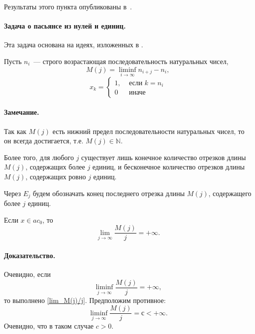 Результаты этого пункта опубликованы в~\cite{our-mz2019ac0}.

\paragraph{Задача о пасьянсе из нулей и единиц.}

Эта задача основана на идеях, изложенных в \cite[\S 5]{Semenov2014geomprops}.

Пусть $n_i$~--- строго возрастающая последовательность натуральных чисел,
\begin{equation}
	\label{eq:definition_M_j}
	M(j) = \liminf_{i\to\infty} n_{i+j} - n_i,
\end{equation}
\begin{equation}
	x_k = \left\{\begin{array}{ll}
		1, & \mbox{~если~} k = n_i
		\\
		0  & \mbox{~иначе~}
	\end{array}\right.
\end{equation}

\paragraph{Замечание.}
Так как $M(j)$ есть нижний предел последовательности натуральных чисел,
то он всегда достигается,
т.е. $M(j)\in\mathbb{N}$.

Более того, для любого $j$ существует лишь конечное количество отрезков длины $M(j)$,
содержащих более $j$ единиц,
и бесконечное количество отрезков длины $M(j)$,
содержащих ровно $j$ единиц.

Через $E_j$ будем обозначать конец последнего отрезка длины $M(j)$,
содержащего более $j$ единиц.

\begin{lemma}
	Если $x \in ac_0$, то
	\begin{equation}\label{lim_M(j)/j}
		\lim_{j \to \infty} \frac{M(j)}{j} = +\infty
		.
	\end{equation}
\end{lemma}

\paragraph{Доказательство.}
Очевидно, если
\begin{equation}
	\liminf_{j \to \infty} \frac{M(j)}{j} = +\infty
	,
\end{equation}
то выполнено \eqref{lim_M(j)/j}.
Предположим противное:
\begin{equation}
	\liminf_{j \to \infty} \frac{M(j)}{j} = с < +\infty
	.
\end{equation}
Очевидно, что в таком случае $c>0$.

